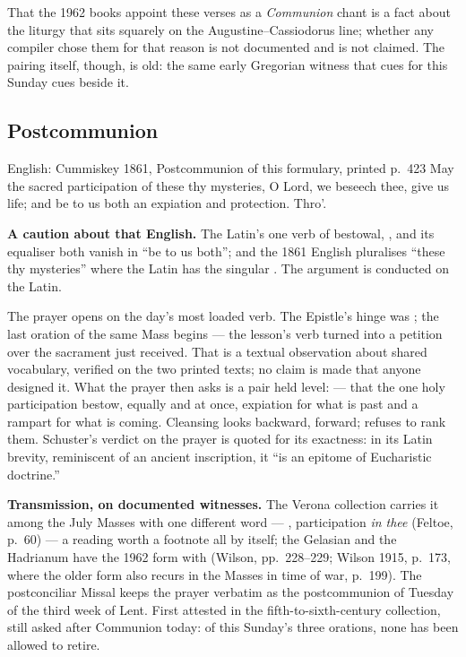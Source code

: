 That the 1962 books appoint these verses as a \textit{Communion} chant is a
fact about the liturgy that sits squarely on the Augustine--Cassiodorus line;
whether any compiler chose them for that reason is not documented and is not
claimed. The pairing itself, though, is old: the same early Gregorian witness
that cues  for this Sunday cues  beside it.

\elementguard
\subsection*{Postcommunion }


\begin{namedtranslation}{English: Cummiskey 1861, Postcommunion of this formulary, printed p.~423}
May the sacred participation of these thy mysteries, O Lord, we beseech thee,
give us life; and be to us both an expiation and protection. Thro'.
\end{namedtranslation}

\textbf{A caution about that English.} The Latin's one verb of bestowal,
, and its equaliser  both vanish in ``be to us
both''; and the 1861 English pluralises ``these thy mysteries'' where the
Latin has the singular . The argument is
conducted on the Latin.

The prayer opens on the day's most loaded verb. The Epistle's hinge was
; the last oration of the same Mass begins
 --- the lesson's verb turned into a petition over the
sacrament just received. That is a textual observation about shared
vocabulary, verified on the two printed texts; no claim is made that anyone
designed it. What the prayer then asks is a pair held level:  --- that the one holy
participation bestow, equally and at once, expiation for what is past and a
rampart for what is coming. Cleansing looks backward, 
forward;  refuses to rank them. Schuster's verdict on the
prayer is quoted for its exactness: in its Latin brevity, reminiscent of an
ancient inscription, it ``is an epitome of Eucharistic doctrine.''

\textbf{Transmission, on documented witnesses.} The Verona collection
carries it among the July Masses with one different word --- , participation \textit{in thee}
(Feltoe, p.~60) --- a reading worth a footnote all by itself; the Gelasian
and the Hadrianum have the 1962 form with  (Wilson, pp.\
228--229; Wilson 1915, p.~173, where the older  form also
recurs in the Masses in time of war, p.~199). The postconciliar Missal keeps
the prayer verbatim as the postcommunion of Tuesday of the third week of
Lent. First attested in the fifth-to-sixth-century collection, still asked
after Communion today: of this Sunday's three orations, none has been
allowed to retire.
